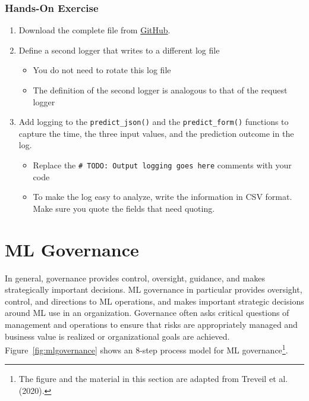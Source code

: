\begin{tcolorbox}[colback=code]
\subsubsection*{Hands-On Exercise}
\begin{enumerate}
\item Download the complete file from \href{https://github.com/jevermann/busi4720-mlops/blob/main/flask_deploy_logging.py}{GitHub}.
\item Define a second logger that writes to a different log file
\begin{itemize}
  \item You do not need to rotate this log file
  \item The definition of the second logger is analogous to that of the request logger
\end{itemize}
\item Add logging to the \texttt{predict\_json()} and the \texttt{predict\_form()} functions to capture the time, the three input values, and the prediction outcome in the log.
\begin{itemize}
   \item Replace the \texttt{\# TODO: Output logging goes here} comments with your code
   \item To make the log easy to analyze, write the information in CSV format. Make sure you quote the fields that need quoting.
\end{itemize}
\end{enumerate}
\end{tcolorbox}

\section{ML Governance}

In general, governance provides control, oversight, guidance, and makes strategically important decisions. ML governance in particular provides oversight, control, and directions to ML operations, and makes important strategic decisions around ML use in an organization. Governance often asks critical questions of management and operations to ensure that risks are appropriately managed and business value is realized or organizational goals are achieved. Figure~\ref{fig:mlgovernance} shows an 8-step process model for ML governance\footnote{The figure and the material in this section are adapted from Treveil et al. (2020).}.

